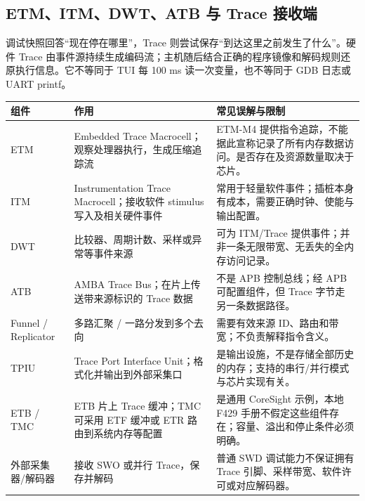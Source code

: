 \documentclass[UTF8,a4paper,11pt,oneside,fontset=none]{ctexart}
\begin{document}
\subsection{ETM、ITM、DWT、ATB 与 Trace 接收端}\label{sec:trace}
调试快照回答“现在停在哪里”，Trace 则尝试保存“到达这里之前发生了什么”。硬件 Trace 由事件源持续生成编码流；主机随后结合正确的程序镜像和解码规则还原执行信息。它不等同于 TUI 每 100 ms 读一次变量，也不等同于 GDB 日志或 UART printf。

\begin{longtable}{@{}P{25mm}P{64mm}P{72mm}@{}}\toprule
组件 & 作用 & 常见误解与限制\\\midrule\endhead
ETM & Embedded Trace Macrocell；观察处理器执行，生成压缩追踪流 & ETM-M4 提供指令追踪，不能据此宣称记录了所有内存数据访问。是否存在及资源数量取决于芯片。\\
ITM & Instrumentation Trace Macrocell；接收软件 stimulus 写入及相关硬件事件 & 常用于轻量软件事件；插桩本身有成本，需要正确时钟、使能与输出配置。\\
DWT & 比较器、周期计数、采样或异常等事件来源 & 可为 ITM/Trace 提供事件；并非一条无限带宽、无丢失的全内存访问记录。\\
ATB & AMBA Trace Bus；在片上传送带来源标识的 Trace 数据 & 不是 APB 控制总线；经 APB 可配置组件，但 Trace 字节走另一条数据路径。\\
Funnel / Replicator & 多路汇聚 / 一路分发到多个去向 & 需要有效来源 ID、路由和带宽；不负责解释指令含义。\\
TPIU & Trace Port Interface Unit；格式化并输出到外部采集口 & 是输出设施，不是存储全部历史的内存；支持的串行/并行模式与芯片实现有关。\\
ETB / TMC & ETB 片上 Trace 缓冲；TMC 可采用 ETF 缓冲或 ETR 路由到系统内存等配置 & 是通用 CoreSight 示例，本地 F429 手册不假定这些组件存在；容量、溢出和停止条件必须明确。\\
外部采集器/解码器 & 接收 SWO 或并行 Trace，保存并解码 & 普通 SWD 调试能力不保证拥有 Trace 引脚、采样带宽、软件许可或对应解码器。\\\bottomrule
\end{longtable}
\end{document}
